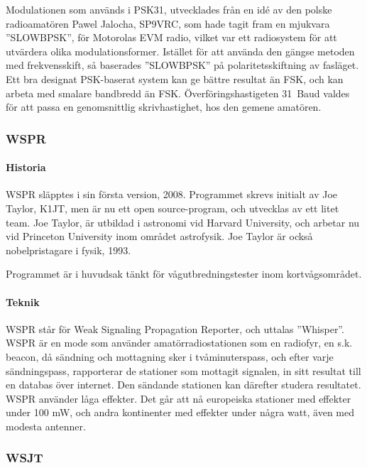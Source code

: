 Modulationen som används i PSK31, utvecklades från en idé av den polske
radioamatören Pawel Jalocha, SP9VRC, som hade tagit fram en mjukvara
''SLOWBPSK'', för Motorolas EVM radio, vilket var ett radiosystem för att
utvärdera olika modulationsformer.
Istället för att använda den gängse metoden med frekvensskift, så baserades
''SLOWBPSK'' på polaritetsskiftning av fasläget.
Ett bra designat PSK-baserat system kan ge bättre resultat än FSK, och kan
arbeta med smalare bandbredd än FSK.
Överföringshastigeten 31~Baud valdes för att passa en genomsnittlig
skrivhastighet, hos den gemene amatören.

\subsubsection{WSPR}

\paragraph{Historia}

WSPR släpptes i sin första version, 2008.
Programmet skrevs initialt av Joe Taylor, K1JT, men är nu ett
open source-program, och utvecklas av ett litet team. 
Joe Taylor, är utbildad i astronomi vid Harvard University, och arbetar nu vid
Princeton University inom området astrofysik.
Joe Taylor är också nobelpristagare i fysik, 1993.

Programmet är i huvudsak tänkt för vågutbredningstester inom kortvågsområdet.

\paragraph{Teknik}

WSPR står för Weak Signaling Propagation Reporter, och uttalas ''Whisper''. 
WSPR är en mode som använder amatörradiostationen som en radiofyr, en s.k.
beacon, då sändning och mottagning sker i tvåminuterspass, och efter varje
sändningspass, rapporterar de stationer som mottagit signalen, in sitt resultat
till en databas över internet.
Den sändande stationen kan därefter studera resultatet.
WSPR använder låga effekter.
Det går att nå europeiska stationer med effekter under 100 mW, och andra
kontinenter med effekter under några watt, även med modesta antenner.

\subsubsection{WSJT}


